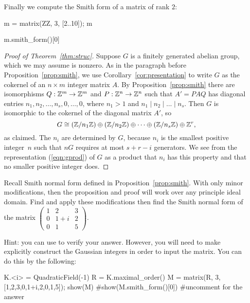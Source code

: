 \begin{example}
Finally we compute the Smith form of a matrix of rank $2$:
\begin{sagecode}
\begin{sagecell}
m = matrix(ZZ, 3, [2..10]); m
\end{sagecell}
\begin{sageout}
[ 2  3  4]
[ 5  6  7]
[ 8  9 10]
\end{sageout}
\begin{sagecell}
m.smith_form()[0]
\end{sagecell}
\begin{sageout}
[1 0 0]
[0 3 0]
[0 0 0]
\end{sageout}
\end{sagecode}
\end{example}


\begin{proof}[Proof of Theorem~\ref{thm:struc}] 
Suppose $G$ is a finitely generated abelian group, which we may assume
is nonzero.  As in the paragraph before Proposition~\ref{prop:smith},
we use Corollary~\ref{cor:presentation} to write $G$ as the cokernel
of an $n\times m$ integer matrix $A$.  By Proposition~\ref{prop:smith}
there are isomorphisms $Q:\mathbb{Z}^m\to \mathbb{Z}^m$ and $P:\mathbb{Z}^n\to \mathbb{Z}^n$ such that
$A'=PAQ$ has diagonal entries $n_1, n_2,\ldots,
n_s,0,\ldots,0$, where $n_1>1$ and $n_1\mid n_2 \mid{} \ldots \mid{}
n_s$.  Then $G$ is isomorphic to the cokernel of the diagonal matrix
$A'$, so
\begin{equation}
\label{eqn:gprod}
  G \cong (\mathbb{Z}/n_1\mathbb{Z}) \oplus (\mathbb{Z}/n_2\mathbb{Z})
 \oplus \cdots \oplus (\mathbb{Z}/n_s\mathbb{Z}) \oplus \mathbb{Z}^{r},
\end{equation}
as claimed.  The $n_i$ are determined by $G$, because $n_i$ is the
smallest positive integer~$n$ such that $nG$ requires at most $s+r-i$
generators. We see from the representation (\ref{eqn:gprod}) of $G$ as
a product that $n_i$ has this property and that no smaller positive
integer does.
\end{proof}

\begin{exercise}
	Recall Smith normal form defined in Proposition~\ref{prop:smith}. With only minor modifications, then the proposition and proof will work over any principle ideal domain. Find and apply these modifications then find the Smith normal form of the matrix $\begin{pmatrix} 1 & 2 & 3 \\ 0 & 1+i & 2 \\ 0 & 1 & 5 \end{pmatrix}$.
	
	Hint: you can use \sage{} to verify your answer. However, you will need to make explicitly construct the Gaussian integers in order to input the matrix. You can do this by the following:
	\begin{sagecode}
	\begin{sagecell}
K.<i> = QuadraticField(-1)
R = K.maximal_order()
M = matrix(R, 3, [1,2,3,0,1+i,2,0,1,5]); show(M)
#show(M.smith_form()[0]) #uncomment for the answer
	\end{sagecell}
	\end{sagecode}
\end{exercise}

